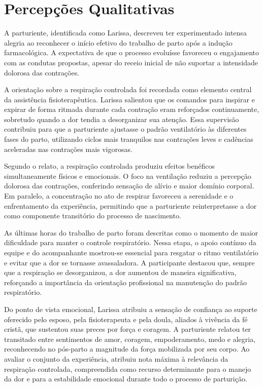 \documentclass[openright]{tex/estilos/normas-utf-tex}
\begin{document}
\section{Percepções Qualitativas}
\label{sec:percepcoes}

A parturiente, identificada como Larissa, descreveu ter experimentado intensa alegria ao reconhecer o início efetivo do trabalho de parto após a indução farmacológica. A expectativa de que o processo evoluísse favoreceu o engajamento com as condutas propostas, apesar do receio inicial de não suportar a intensidade dolorosa das contrações.

A orientação sobre a respiração controlada foi recordada como elemento central da assistência fisioterapêutica. Larissa salientou que os comandos para inspirar e expirar de forma ritmada durante cada contração eram reforçados continuamente, sobretudo quando a dor tendia a desorganizar sua atenção. Essa supervisão contribuiu para que a parturiente ajustasse o padrão ventilatório às diferentes fases do parto, utilizando ciclos mais tranquilos nas contrações leves e cadências aceleradas nas contrações mais vigorosas.

Segundo o relato, a respiração controlada produziu efeitos benéficos simultaneamente físicos e emocionais. O foco na ventilação reduziu a percepção dolorosa das contrações, conferindo sensação de alívio e maior domínio corporal. Em paralelo, a concentração no ato de respirar favoreceu a serenidade e o enfrentamento da experiência, permitindo que a parturiente reinterpretasse a dor como componente transitório do processo de nascimento.

As últimas horas do trabalho de parto foram descritas como o momento de maior dificuldade para manter o controle respiratório. Nessa etapa, o apoio contínuo da equipe e do acompanhante mostrou-se essencial para resgatar o ritmo ventilatório e evitar que a dor se tornasse avassaladora. A participante destacou que, sempre que a respiração se desorganizou, a dor aumentou de maneira significativa, reforçando a importância da orientação profissional na manutenção do padrão respiratório.

Do ponto de vista emocional, Larissa atribuiu a sensação de confiança ao suporte oferecido pelo esposo, pela fisioterapeuta e pela doula, aliados à vivência da fé cristã, que sustentou suas preces por força e coragem. A parturiente relatou ter transitado entre sentimentos de amor, coragem, empoderamento, medo e alegria, reconhecendo no pós-parto a magnitude da força mobilizada por seu corpo. Ao avaliar o conjunto da experiência, atribuiu nota máxima à relevância da respiração controlada, compreendida como recurso determinante para o manejo da dor e para a estabilidade emocional durante todo o processo de parturição.
\end{document}
